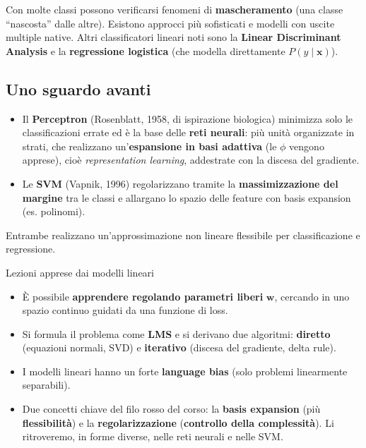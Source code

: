 Con molte classi possono verificarsi fenomeni di \textbf{mascheramento}
(una classe ``nascosta'' dalle altre). Esistono approcci più sofisticati
e modelli con uscite multiple native. Altri classificatori lineari noti
sono la \textbf{Linear Discriminant Analysis} e la \textbf{regressione
logistica} (che modella direttamente \(P(y \mid \mathbf{x})\)).

\subsection{Uno sguardo avanti}\label{uno-sguardo-avanti}

\begin{itemize}
\tightlist
\item
  Il \textbf{Perceptron} (Rosenblatt, 1958, di ispirazione biologica)
  minimizza solo le classificazioni errate ed è la base delle
  \textbf{reti neurali}: più unità organizzate in strati, che realizzano
  un'\textbf{espansione in basi adattiva} (le \(\phi\) vengono apprese),
  cioè \emph{representation learning}, addestrate con la discesa del
  gradiente.
\item
  Le \textbf{SVM} (Vapnik, 1996) regolarizzano tramite la
  \textbf{massimizzazione del margine} tra le classi e allargano lo
  spazio delle feature con basis expansion (es. polinomi).
\end{itemize}

Entrambe realizzano un'approssimazione non lineare flessibile per
classificazione e regressione.

\begin{boxabstract}{Lezioni apprese dai modelli lineari}

\begin{itemize}
\tightlist
\item
  È possibile \textbf{apprendere regolando parametri liberi}
  \(\mathbf{w}\), cercando in uno spazio continuo guidati da una
  funzione di loss.
\item
  Si formula il problema come \textbf{LMS} e si derivano due algoritmi:
  \textbf{diretto} (equazioni normali, SVD) e \textbf{iterativo}
  (discesa del gradiente, delta rule).
\item
  I modelli lineari hanno un forte \textbf{language bias} (solo problemi
  linearmente separabili).
\item
  Due concetti chiave del filo rosso del corso: la \textbf{basis
  expansion} (più \textbf{flessibilità}) e la \textbf{regolarizzazione}
  (\textbf{controllo della complessità}). Li ritroveremo, in forme
  diverse, nelle reti neurali e nelle SVM.
\end{itemize}

\end{boxabstract}

